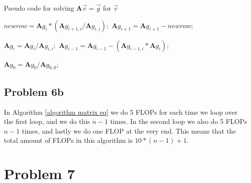 \documentclass[english,notitlepage]{revtex4-1}  %
\begin{document}
\begin{algorithm}[H]
    \caption{Pseudo code for solving $\textbf{A}\vec{v} = \vec{g}$ for $\vec{v}$}\label{algorithm matrix eq}
    \begin{algorithmic}
         
        \State $newrow = \textbf{A}g_i * \left(\textbf{A}g_{i+1,i} / \textbf{A}g_{i,i} \right);$ 
        \State $\textbf{A}g_{i+1} = \textbf{A}g_{i+1} - newrow;$
        \EndFor

         
        \State $\textbf{A}g_{i} = \textbf{A}g_{i} / \textbf{A}g_{i,i};$
        \State $\textbf{A}g_{i-1} = \textbf{A}g_{i-1} - \left(\textbf{A}g_{i-1,i}*\textbf{A}g_{i}\right);$
        \EndFor

        \State $\textbf{A}g_{0} = \textbf{A}g_{0} / \textbf{A}g_{0,0};$ 
    \end{algorithmic}
\end{algorithm}

\subsection*{Problem 6b}
In Algorithm \ref*{algorithm matrix eq} we do 5 FLOPs for each time we loop over the first loop, and we do this $n-1$ times. In the second loop we also do 5 FLOPs $n-1$ times, and lastly we do one FLOP at the very end. This means that the total amount of FLOPs in this algorithm is $10*(n-1) + 1$.


\section*{Problem 7}
\end{document}
